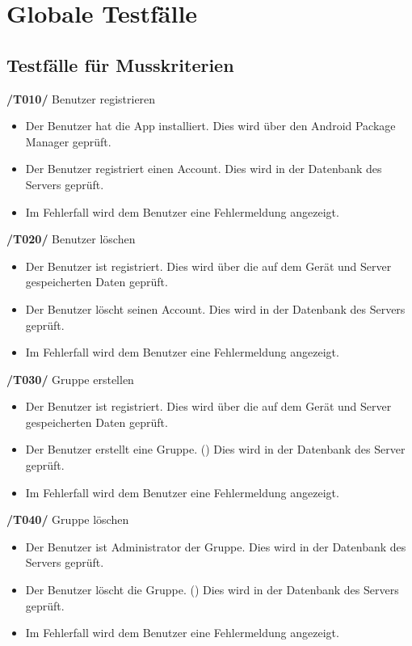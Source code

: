 \section{Globale Testfälle}
\subsection{Testfälle für Musskriterien}
\textbf{/T010/} Benutzer registrieren \\
\begin{itemize}
\setlength{\itemsep}{0pt}
\item Der Benutzer hat die App installiert. Dies wird über den Android Package Manager geprüft.
\item Der Benutzer registriert einen Account. Dies wird in der Datenbank des Servers geprüft.
\item Im Fehlerfall wird dem Benutzer eine Fehlermeldung angezeigt.
\end{itemize}


\textbf{/T020/} Benutzer löschen \\
\begin{itemize}
\setlength{\itemsep}{0pt}
\item Der Benutzer ist registriert. Dies wird über die auf dem Gerät
und Server gespeicherten Daten geprüft.
\item Der Benutzer löscht seinen Account. Dies wird in der Datenbank des Servers geprüft.
\item Im Fehlerfall wird dem Benutzer eine Fehlermeldung angezeigt.
\end{itemize}


\textbf{/T030/} Gruppe erstellen \\
\begin{itemize}
\setlength{\itemsep}{0pt}
\item Der Benutzer ist registriert. Dies wird über die auf dem Gerät
und Server gespeicherten Daten geprüft.
\item Der Benutzer erstellt eine Gruppe. () Dies wird in der Datenbank des Server geprüft.
\item Im Fehlerfall wird dem Benutzer eine Fehlermeldung angezeigt.
\end{itemize}

\textbf{/T040/} Gruppe löschen \\
\begin{itemize}
\setlength{\itemsep}{0pt}
\item Der Benutzer ist Administrator der Gruppe. Dies wird in der Datenbank des Servers geprüft.
\item Der Benutzer löscht die Gruppe. () Dies wird in der Datenbank des Servers geprüft.
\item Im Fehlerfall wird dem Benutzer eine Fehlermeldung angezeigt.
\end{itemize}

